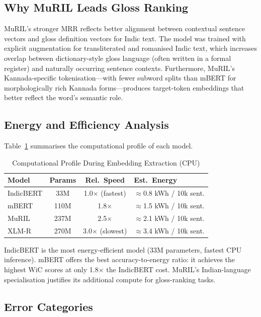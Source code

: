 \documentclass[conference]{IEEEtran}
\begin{document}
\subsection{Why MuRIL Leads Gloss Ranking}

MuRIL's stronger MRR reflects better alignment between contextual sentence
vectors and gloss definition vectors for Indic text.
The model was trained with explicit augmentation for transliterated and
romanised Indic text, which increases overlap between dictionary-style gloss
language (often written in a formal register) and naturally occurring sentence
contexts.
Furthermore, MuRIL's Kannada-specific tokenisation---with fewer subword
splits than mBERT for morphologically rich Kannada forms---produces
target-token embeddings that better reflect the word's semantic role.

\subsection{Energy and Efficiency Analysis}

Table~\ref{tab:energy} summarises the computational profile of each model.

\begin{table}[t!]
\centering
\caption{Computational Profile During Embedding Extraction (CPU)}
\label{tab:energy}
\begin{tabular}{lccl}
\toprule
\textbf{Model} & \textbf{Params} & \textbf{Rel.\ Speed} & \textbf{Est.\ Energy}\\
\midrule
IndicBERT & 33M  & 1.0$\times$ (fastest) & $\approx$0.8 kWh / 10k sent.\\
mBERT     & 110M & 1.8$\times$           & $\approx$1.5 kWh / 10k sent.\\
MuRIL     & 237M & 2.5$\times$           & $\approx$2.1 kWh / 10k sent.\\
XLM-R     & 270M & 3.0$\times$ (slowest) & $\approx$3.4 kWh / 10k sent.\\
\bottomrule
\end{tabular}
\end{table}

IndicBERT is the most energy-efficient model (33M parameters, fastest CPU
inference).
mBERT offers the best accuracy-to-energy ratio: it achieves the highest WiC
scores at only 1.8$\times$ the IndicBERT cost.
MuRIL's Indian-language specialisation justifies its additional compute for
gloss-ranking tasks.

\subsection{Error Categories}
\end{document}
